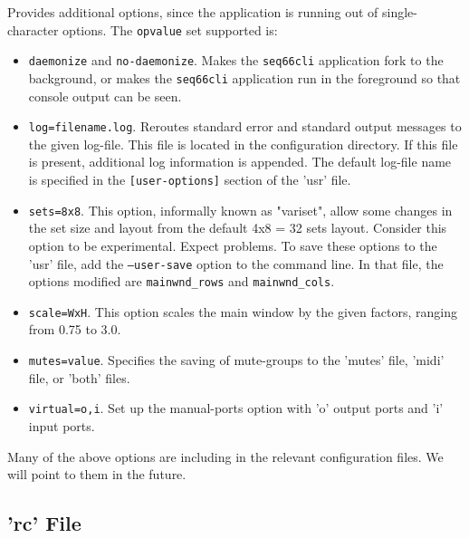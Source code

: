       Provides additional options, since the application is running out of
      single-character options.  The \texttt{opvalue} set supported is:
      \begin{itemize}
         \item \texttt{daemonize} and \texttt{no-daemonize}.
            Makes the \texttt{seq66cli} application fork to the background, or
            makes the \texttt{seq66cli} application
            run in the foreground so that console output can be seen.
         \item \texttt{log=filename.log}.
            Reroutes standard error and standard
            output messages to the given log-file.  This file is located in
            the configuration directory.
            If this file is present, additional log information is appended.
            The default log-file name is specified in the
            \texttt{[user-options]} section of the 'usr' file.
         \item \texttt{sets=8x8}.
            This option, informally known as "variset", allow some changes in
            the set size and layout from the default 4x8 = 32 sets layout.
            Consider this option to be experimental. Expect problems.
            To save these options to the 'usr' file, add the
            \texttt{--user-save} option to the command line.
            In that file, the options modified are \texttt{mainwnd\_rows} and
            \texttt{mainwnd\_cols}.
         \item \texttt{scale=WxH}.
            This option scales the main window by the given factors,
            ranging from 0.75 to 3.0.
         \item \texttt{mutes=value}. Specifies the saving of mute-groups
            to the 'mutes' file, 'midi' file, or 'both' files.
         \item \texttt{virtual=o,i}. Set up the manual-ports option with 'o'
            output ports and 'i' input ports.
      \end{itemize}

      Many of the above options are including in the relevant configuration
      files.  We will point to them in the future.

\subsection{'rc' File}
\label{subsec:configuration_rc}

